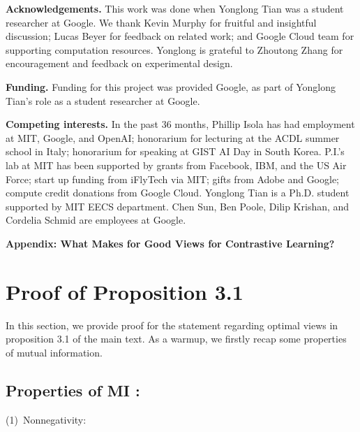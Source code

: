 \documentclass{article}
\begin{document}
 \begin{ack}

\noindent \textbf{Acknowledgements.} This work was done when Yonglong Tian was a student researcher at Google.
We thank Kevin Murphy for fruitful and insightful discussion; Lucas Beyer for feedback on related work;
and Google Cloud team for supporting computation resources. Yonglong is grateful to Zhoutong Zhang
for encouragement and feedback on experimental design.

\noindent \textbf{Funding.} Funding for this project was provided Google, as part of Yonglong Tian's role as a student researcher at Google.

\noindent \textbf{Competing interests.} In the past 36 months, Phillip Isola has had employment at MIT, Google, and OpenAI; honorarium for lecturing at the ACDL summer school in Italy; honorarium for speaking at GIST AI Day in South Korea. P.I.’s lab at MIT has been supported by grants from Facebook, IBM, and the US Air Force; start up funding from iFlyTech via MIT; gifts from Adobe and Google; compute credit donations from Google Cloud. Yonglong Tian is a Ph.D. student supported by MIT EECS department. Chen Sun, Ben Poole, Dilip Krishan, and Cordelia Schmid are employees at Google.



\end{ack} 



\clearpage
\onecolumn
\begin{center}
{\Large\bf{Appendix: What Makes for Good Views for Contrastive Learning?}\\
}
\end{center}
\maketitle

\appendix
\section{Proof of Proposition 3.1}

In this section, we provide proof for the statement regarding optimal views in proposition 3.1 of the main text. As a warmup, we firstly recap some properties of mutual information.

\subsection{Properties of MI \protect\cite{cover1991entropy}:}
\noindent(1)~Nonnegativity:
\end{document}
